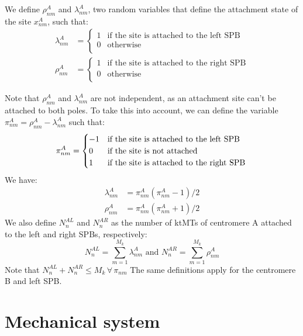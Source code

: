 \documentclass[a4paper,12pt]{article}
\renewcommand{\leq}{\leqslant}
\begin{document}
We define $\rho_{nm}^A$ and $\lambda_{nm}^A$, two random variables that define
the attachment state of the site $x_{nm}^A$, such that:
\begin{align}
  \label{eq:rholambda}
  \lambda_{nm}^A &=
  \begin{cases}
    1 &\text{if the site is attached to the left SPB}\\
    0 &\text{otherwise}\\
  \end{cases}\\
  \rho_{nm}^A &= 
  \begin{cases}
    1 &\text{if the site is attached to the right SPB}\\
    0 &\text{otherwise}\\
  \end{cases}
\end{align}

Note that $\rho_{nm}^A$ and $\lambda_{nm}^A$ are not independent, as
an attachment site can't be attached to both poles. To take this into
account, we can define the variable $\pi_{nm}^A = \rho_{nm}^A -
\lambda_{nm}^A$ such that:
\begin{equation}
  \label{eq:pnm}
  \pi_{nm}^A = 
  \begin{cases}
    - 1 &\text{if the site is attached to the left SPB}\\
    0 &\text{if the site is not attached}\\
    1 &\text{if the site is attached to the right SPB}\\
  \end{cases}\\
\end{equation}
We have:
\begin{align}
  \lambda_{nm}^A &= \pi_{nm}^A\left(\pi_{nm}^A - 1\right)/2\\
  \rho_{nm}^A &= \pi_{nm}^A\left(\pi_{nm}^A + 1\right)/2
\end{align}
We also define $N_n^{AL}$ and $N_n^{AR}$ as the number of ktMTs of
centromere A attached to the left and right SPBs, respectively:
\begin{equation}
  \label{eq:NAL}
  N_n^{AL} = \sum_{m = 1}^{M_k}\lambda_{nm}^A \mbox{ and }%
  N_n^{AR} = \sum_{m = 1}^{M_k}\rho_{nm}^A 
\end{equation}
Note that $N_n^{AL} + N_n^{AR} \leq M_k\, \forall\, \pi_{nm} $
The same definitions apply for the centromere B and left SPB.

\section{Mechanical system}
\end{document}
